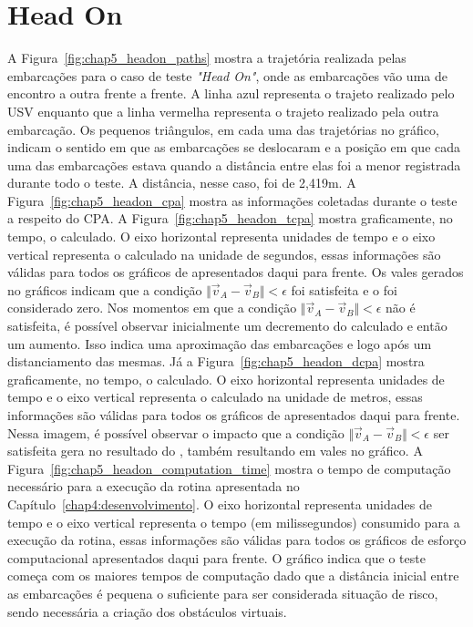     \section{Head On} \label{subchap5_headon}
        
        A Figura~\ref{fig:chap5_headon_paths} mostra a trajetória realizada pelas embarcações para o caso de teste \textit{"Head On"}, onde as embarcações vão uma de encontro a outra frente a frente. A linha azul representa o trajeto realizado pelo USV enquanto que a linha vermelha representa o trajeto realizado pela outra embarcação. Os pequenos triângulos, em cada uma das trajetórias no gráfico, indicam o sentido em que as embarcações se deslocaram e a posição em que cada uma das embarcações estava quando a distância entre elas foi a menor registrada durante todo o teste. A 
        distância, nesse caso, foi de 2,419m. A Figura~\ref{fig:chap5_headon_cpa} mostra as informações coletadas durante o teste a respeito do CPA. A Figura~\ref{fig:chap5_headon_tcpa} mostra graficamente, no tempo, o \tcpa calculado. O eixo horizontal representa unidades de tempo e o eixo vertical representa o \tcpa calculado na unidade de segundos, essas informações são válidas para todos os gráficos de \tcpa apresentados daqui para frente. Os vales gerados no gráficos indicam que a condição $\Vert\vec{v}_{A}-\vec{v}_{B}\Vert < \epsilon$ foi satisfeita e o \tcpa foi considerado zero. Nos momentos em que a 
        condição $\Vert\vec{v}_{A}-\vec{v}_{B}\Vert < \epsilon$ não é satisfeita, é possível observar inicialmente um decremento do \tcpa calculado e então um aumento. Isso indica uma aproximação das embarcações e logo após um distanciamento das mesmas.
        Já a Figura~\ref{fig:chap5_headon_dcpa} mostra graficamente, no tempo, o \dcpa calculado. O eixo horizontal representa unidades de tempo e o eixo vertical representa o \dcpa calculado na unidade de metros, essas informações são válidas para todos os gráficos de \dcpa apresentados daqui para frente. Nessa imagem, é possível observar o impacto que a condição $\Vert\vec{v}_{A}-\vec{v}_{B}\Vert < \epsilon$ ser satisfeita gera no resultado do \dcpa, também resultando em vales no gráfico. A Figura~\ref{fig:chap5_headon_computation_time} mostra o tempo de computação necessário para a execução da rotina apresentada no 
        Capítulo~\ref{chap4:desenvolvimento}. O eixo horizontal representa unidades de tempo e o eixo vertical representa o tempo (em milissegundos) consumido para a execução da rotina, essas informações são válidas para todos os gráficos de esforço computacional apresentados daqui para frente. O gráfico indica que o teste começa com os maiores tempos de computação dado que a distância inicial entre as embarcações é pequena o suficiente para ser considerada situação de risco, sendo necessária a criação dos obstáculos virtuais.
        
